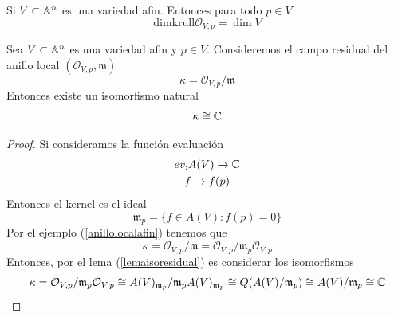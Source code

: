     \begin{propo}\label{dimensiondelanillolocal}
        Si $V\subset\mathbb{A}^n$ es una variedad afin. Entonces para todo $p\in V$
        \begin{equation*}
            \mathrm{dimkrull}\mathcal{O}_{V,p}=\dim V
        \end{equation*}
    \end{propo}

    \begin{lemma}\label{residualisoC}
        Sea $V\subset\mathbb{A}^n$ es una variedad afin y $p\in V$. Consideremos el campo residual del anillo local $(\mathcal{O}_{V,p},\mathfrak{m})$
        \begin{equation*}
            \kappa=\mathcal{O}_{V,p}/\mathfrak{m}
        \end{equation*}
        Entonces existe un isomorfismo natural
        \begin{equation*}
            \kappa\cong \mathbb{C}
        \end{equation*}
    \end{lemma}

    \begin{proof}
        Si consideramos la función evaluación
        \begin{gather*}
            ev_:A(V)\to \mathbb{C}\\
            f\mapsto f(p)
        \end{gather*}
        Entonces el kernel es el ideal
        \begin{equation*}
            \mathfrak{m}_p=\{f\in A(V):f(p)=0\}
        \end{equation*}
        Por el ejemplo (\ref{anillolocalafin}) tenemos que
        \begin{equation*}
            \kappa=\mathcal{O}_{V,p}/\mathfrak{m}=\mathcal{O}_{V,p}/\mathfrak{m}_p\mathcal{O}_{V,p}
        \end{equation*}
        Entonces, por el lema (\ref{lemaisoresidual}) es considerar los isomorfismos
        \begin{equation*}
            \kappa=\mathcal{O}_{V,p}/\mathfrak{m}_p\mathcal{O}_{V,p}\cong A(V)_{\mathfrak{m}_p}/\mathfrak{m}_pA(V)_{\mathfrak{m}_p}\cong Q(A(V)/\mathfrak{m}_p)\cong A(V)/\mathfrak{m}_p\cong \mathbb{C}
        \end{equation*}
    \end{proof}

    